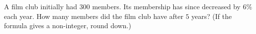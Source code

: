 A film club initially had $300$ members. Its membership has since decreased by $6\%$ each year. How many members did the film club have after $5$ years? (If the formula gives a non-integer, round down.)
